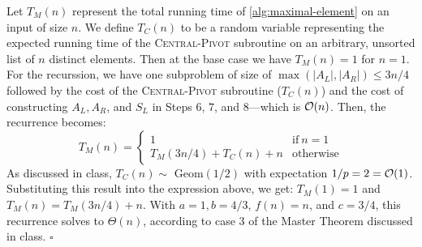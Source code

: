 \documentclass{article}
\begin{document}
\begin{enumerate}[leftmargin={*}, font={\bf}, label={\arabic*.}, ref={\arabic*}]
\begin{enumerate}
        Let $T_M(n)$ represent the total running time of \autoref{alg:maximal-element} on an input of size
        $n$. We define $T_C(n)$ to be a random variable representing the expected running time of the
        \textsc{Central-Pivot} subroutine on an arbitrary, unsorted list of $n$ distinct elements. Then at
        the base case we have $T_M(n) = 1$ for $n = 1$. For the recurssion, we have one subproblem of size of
        $\max(|A_L|, |A_R|) \leq 3n/4$ followed by the cost of the \textsc{Central-Pivot} subroutine
        ($T_C(n)$) and the cost of constructing $A_L, A_R$, and $S_L$ in Steps $6$, $7$, and $8$---which is
        $\operatorname*{\mathcal{O}}(n)$. Then, the recurrence becomes:
        \[
          T_M(n) =
            \begin{cases}
              1 & \text{if}\ n = 1 \\
              T_M(3n/4) + T_C(n) + n & \text{otherwise}
            \end{cases}
        \]
        As discussed in class, $T_C(n) \sim$ Geom$(1/2)$ with expectation $1/p = 2 = \operatorname*{\mathcal{O}}(1)$. Substituting this
        result into the expression above, we get: $T_M(1) = 1$ and $T_M(n) = T_M(3n/4) + n$. With $a = 1, b = 
        4/3$, $f(n) = n$, and $c = 3/4$, this recurrence solves to $\Theta(n)$, according to case $3$ of the
        Master Theorem discussed in class. \hfill $\square$
    \end{enumerate}
\end{enumerate}
\end{document}
